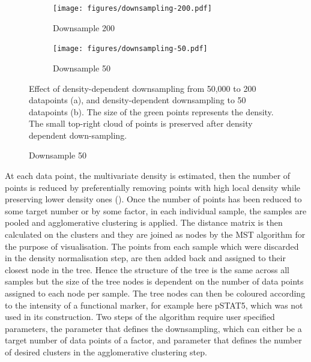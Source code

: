 \hspace{-2cm}
\begin{figure}[h]
\centering
\begin{subfigure}[c]{.45\linewidth}
    \centering
  \texttt{[image: figures/downsampling-200.pdf]}
\caption{Downsample 200}
\end{subfigure}
\begin{subfigure}[c]{.45\linewidth}
    \centering
  \texttt{[image: figures/downsampling-50.pdf]}
  \caption{Downsample 50}
\end{subfigure}
{
Effect of density-dependent downsampling from 50,000 to 200 datapoints (a), and density-dependent downsampling to 50 datapoints (b). 
The size of the green points represents the density.
The small top-right cloud of points is preserved after density dependent down-sampling.
}
\end{figure}

At each data point, the multivariate density is estimated, then the number of points is reduced by preferentially removing 
points with high local density while preserving lower density ones ().
Once the number of points has been reduced to some target number or by some factor, in each individual sample,
the samples are pooled and agglomerative clustering is applied.
The distance matrix is then calculated on the clusters and they are joined as nodes by the \acrfull{MST} algorithm for the purpose of visualisation.
The points from each sample which were discarded in the density normalisation step, are then added back and assigned to their closest node in the tree.
Hence the structure of the tree is the same across all samples but the size of the tree nodes 
is dependent on the number of data points assigned to each node per sample.
The tree nodes can then be coloured according to the intensity of a functional marker, for example here pSTAT5,
which was not used in its construction.
Two steps of the algorithm require user specified parameters, the parameter that defines the downsampling,
which can either be a target number of data points of a factor, and parameter that defines the number of desired clusters
in the agglomerative clustering step.

